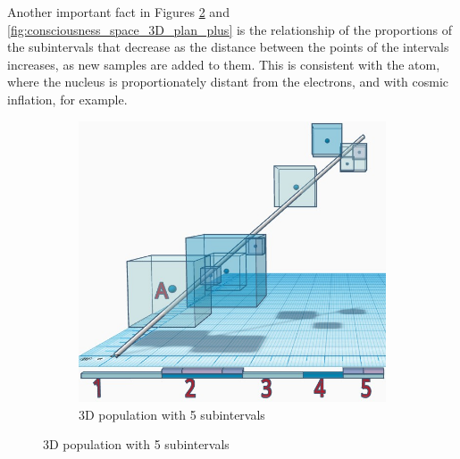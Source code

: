 Another important fact in Figures \ref{fig:consciousness_space_3D_plan} and \ref{fig:consciousness_space_3D_plan_plus} is the relationship of the proportions of the subintervals that decrease as the distance between the points of the intervals increases, as new samples are added to them. This is consistent with the atom, where the nucleus is proportionately distant from the electrons, and with cosmic inflation, for example.
	\begin{figure}[H]
	\centering
		\begin{subfigure}[H]{0.65\linewidth}
		\centering
		\includegraphics[width=1\linewidth]{sections/images/consciousness_space_3D_plan.jpg}
		\caption{3D population with 5 subintervals}
		\label{fig:consciousness_space_3D_plan}
		\end{subfigure}
	

\end{figure}
